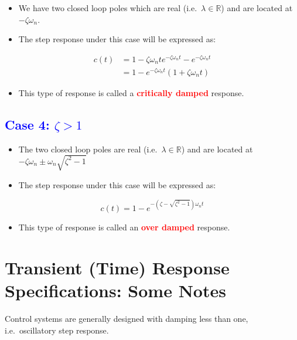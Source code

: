 \documentclass[
  14pt,
  a4paper,
  oneside,
  open=any,
  a4paper,
  14pt]{report}
\providecommand{\tightlist}{%
  \setlength{\itemsep}{0pt}\setlength{\parskip}{0pt}}\usepackage{longtable,booktabs,array}
\begin{document}
\begin{itemize}
\item
  We have two closed loop poles which are real
  (i.e.~\(\lambda \in \mathbb{R}\)) and are located at
  \(-\zeta \omega_n\).
\item
  The step response under this case will be expressed as:
\end{itemize}

\[
\begin{aligned}
    c(t) &= 1 - \zeta \omega_n t e^{-\zeta \omega_n t} - e^{-\zeta \omega_n t} \\
    &= 1 - e^{-\zeta \omega_n t}(1+\zeta\omega_n t)
\end{aligned}
\]

\begin{itemize}
\tightlist
\item
  This type of response is called a \textcolor{red}{\textbf{critically
  damped}} response.
\end{itemize}

\subsection{\texorpdfstring{\textcolor{blue}{Case 4:
\(\zeta > 1\)}}{Case 4: \textbackslash zeta \textgreater{} 1}}\label{case-4-zeta-1}

\begin{itemize}
\item
  The two closed loop poles are real (i.e.~\(\lambda \in \mathbb{R}\))
  and are located at \(-\zeta\omega_n \pm \omega_n \sqrt{\zeta^2 - 1}\)
\item
  The step response under this case will be expressed as:
\end{itemize}

\[
    c(t)= 1- e^{-(\zeta-\sqrt{\zeta^2-1})\omega_n t}
\]

\begin{itemize}
\tightlist
\item
  This type of response is called an \textcolor{red}{\textbf{over
  damped}} response.
\end{itemize}

\section{Transient (Time) Response Specifications: Some
Notes}\label{transient-time-response-specifications-some-notes}

Control systems are generally designed with damping less than one,
i.e.~oscillatory step response.
\end{document}
